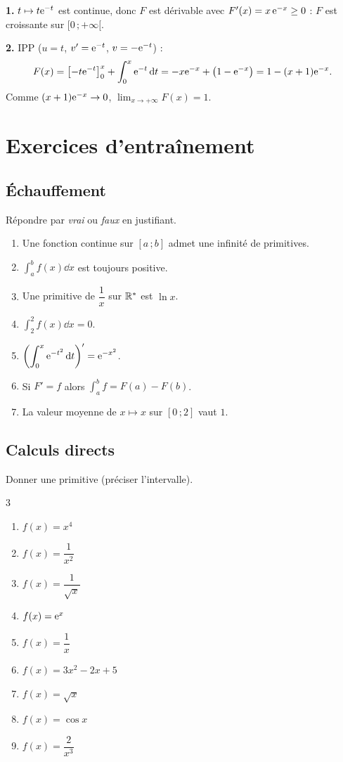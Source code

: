 \solution

\textbf{1.} $t\mapsto t\mathrm{e}^{-t}$ est continue, donc $F$ est dérivable avec
$F'(x)=x\,\mathrm{e}^{-x}\geq 0$ : $F$ est croissante sur $[0\,;+\infty[$.

\textbf{2.} IPP ($u=t$, $v'=\mathrm{e}^{-t}$, $v=-\mathrm{e}^{-t}$) :
\[
F(x)=\bigl[-t\mathrm{e}^{-t}\bigr]_0^{x}+\int_0^{x}\mathrm{e}^{-t}\,\mathrm{d} t
=-x\mathrm{e}^{-x}+\bigl(1-\mathrm{e}^{-x}\bigr)=1-(x+1)\mathrm{e}^{-x}.
\]
Comme $(x+1)\mathrm{e}^{-x}\to 0$, $\displaystyle\lim_{x\to+\infty}F(x)=1$.


\section{Exercices d'entraînement}

\subsection{Échauffement}

Répondre par \emph{vrai} ou \emph{faux} en justifiant.
\begin{enumerate}
	\item Une fonction continue sur $[a\,;b]$ admet une infinité de primitives.
	\item $\displaystyle\int_a^b f(x)\dd x$ est toujours positive.
	\item Une primitive de $\dfrac{1}{x}$ sur $\mathbb{R}^*$ est $\ln x$.
	\item $\displaystyle\int_2^{2} f(x)\dd x=0$.
	\item $\displaystyle\left(\int_0^{x}\mathrm{e}^{-t^{2}}\,\mathrm{d} t\right)'=\mathrm{e}^{-x^{2}}$.
	\item Si $F'=f$ alors $\displaystyle\int_a^b f=F(a)-F(b)$.
	\item La valeur moyenne de $x\mapsto x$ sur $[0\,;2]$ vaut $1$.
\end{enumerate}

\subsection{Calculs directs}

Donner une primitive (préciser l'intervalle).
\begin{multicols}{3}
\begin{enumerate}
	\item $f(x)=x^{4}$
	\item $f(x)=\dfrac{1}{x^{2}}$
	\item $f(x)=\dfrac{1}{\sqrt{x}}$
	\item $f(x)=\mathrm{e}^{x}$
	\item $f(x)=\dfrac{1}{x}$
	\item $f(x)=3x^{2}-2x+5$
	\item $f(x)=\sqrt{x}$
	\item $f(x)=\cos x$
	\item $f(x)=\dfrac{2}{x^{3}}$
\end{enumerate}
\end{multicols}

